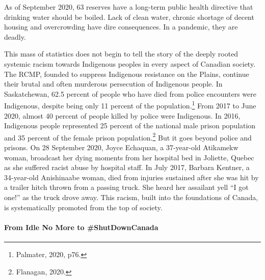 As of September 2020, 63 reserves have a long-term public health directive that drinking water should be boiled. Lack of clean water, chronic shortage of decent housing and overcrowding have dire consequences. In a pandemic, they are deadly.

This mass of statistics does not begin to tell the story of the deeply rooted systemic racism towards Indigenous peoples in every aspect of Canadian society. The RCMP, founded to suppress Indigenous resistance on the Plains, continue their brutal and often murderous persecution of Indigenous people. In Saskatchewan, 62.5 percent of people who have died from police encounters were Indigenous, despite being only 11 percent of the population.\footnote{Palmater, 2020, p76.} From 2017 to June 2020, almost 40 percent of people killed by police were Indigenous. In 2016, Indigenous people represented 25 percent of the national male prison population and 35 percent of the female prison population.\footnote{Flanagan, 2020.} But it goes beyond police and prisons. On 28 September 2020, Joyce Echaquan, a 37-year-old Atikamekw woman, broadcast her dying moments from her hospital bed in Joliette, Quebec as she suffered racist abuse by hospital staff. In July 2017, Barbara Kentner, a 34-year-old Anishinaabe woman, died from injuries sustained after she was hit by a trailer hitch thrown from a passing truck. She heard her assailant yell ``I got one!'' as the truck drove away. This racism, built into the foundations of Canada, is systematically promoted from the top of society.

\paragraph{From Idle No More to \#ShutDownCanada}

